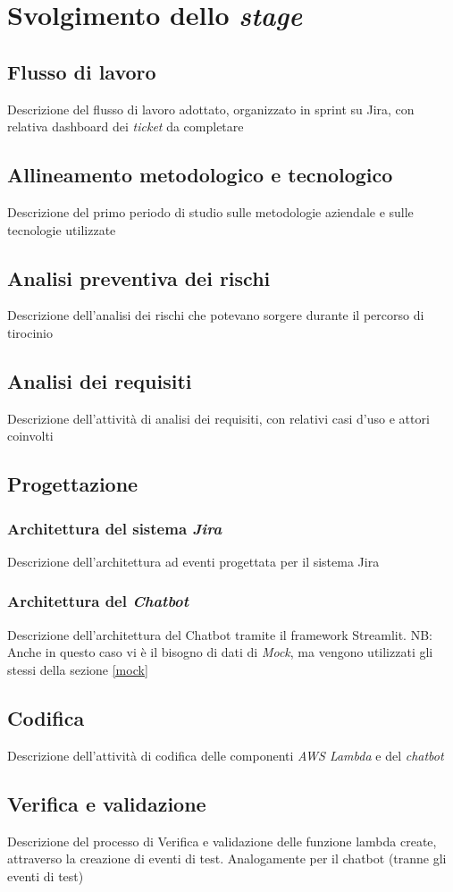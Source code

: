 \chapter{Svolgimento dello \textit{stage}}
\label{cap:descrizione-stage}

\section{Flusso di lavoro}
Descrizione del flusso di lavoro adottato, organizzato in sprint su Jira, con relativa dashboard dei \textit{ticket} da completare
\section{Allineamento metodologico e tecnologico}
Descrizione del primo periodo di studio sulle metodologie aziendale e sulle tecnologie utilizzate
\section{Analisi preventiva dei rischi}
Descrizione dell'analisi dei rischi che potevano sorgere durante il percorso di tirocinio
\section{Analisi dei requisiti}
Descrizione dell'attività di analisi dei requisiti, con relativi casi d'uso e attori coinvolti
\section{Progettazione}
\subsection{Architettura del sistema \textit{Jira}}
Descrizione dell'architettura ad eventi progettata per il sistema Jira
\subsection{Architettura del \textit{Chatbot}}
Descrizione dell'architettura del Chatbot tramite il framework Streamlit.
NB: Anche in questo caso vi è il bisogno di dati di \textit{Mock}, ma vengono utilizzati gli stessi della sezione \ref{mock}
\section{Codifica}
Descrizione dell'attività di codifica delle componenti \textit{AWS Lambda} e del \textit{chatbot}
\section{Verifica e validazione}
Descrizione del processo di Verifica e validazione delle funzione lambda create, attraverso la creazione di eventi di test.
Analogamente per il chatbot (tranne gli eventi di test)

